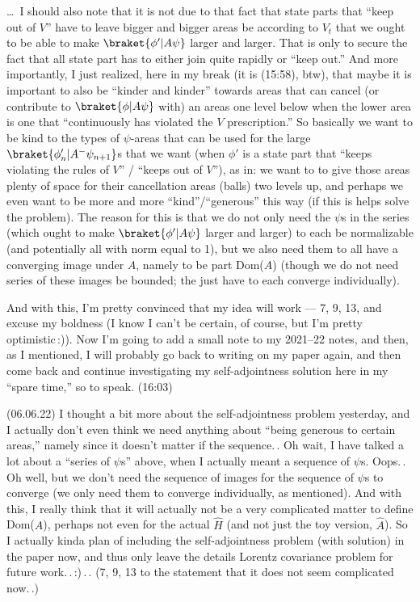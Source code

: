 \documentclass{report}
\begin{document}
\ldots\ I should also note that it is not due to that fact that state parts that ``keep out of $V$'' have to leave bigger and bigger areas be according to $V_t$ that we ought to be able to make $\braket{\phi' | A \psi}$ larger and larger. That is only to secure the fact that all state part has to either join quite rapidly or ``keep out.'' And more importantly, I just realized, here in my break (it is (15:58), btw), that maybe it is important to also be ``kinder and kinder'' towards areas that can cancel (or contribute to $\braket{\phi | A \psi}$ with) an areas one level below when the lower area is one that ``continuously has violated the $V$ prescription.'' So basically we want to be kind to the types of $\psi$-areas that can be used for the large $\braket{\phi_{n}' | A^- \psi_{n+1}}$s that we want (when $\phi'$ is a state part that ``keeps violating the rules of $V$'' / ``keeps out of $V$''), as in: we want to to give those areas plenty of space for their cancellation areas (balls) two levels up, and perhaps we even want to be more and more ``kind''/``generous'' this way (if this is helps solve the problem). The reason for this is that we do not only need the $\psi$s in the series (which ought to make $\braket{\phi' | A \psi}$ larger and larger) to each be normalizable (and potentially all with norm equal to 1), but we also need them to all have a converging image under $A$, namely to be part Dom($A$) (though we do not need series of these images be bounded; the just have to each converge individually). %

And with this, I'm pretty convinced that my idea will work --- 7, 9, 13, and excuse my boldness (I know I can't be certain, of course, but I'm pretty optimistic\,:)). Now I'm going to add a small note to my 2021--22 notes, and then, as I mentioned, I will probably go back to writing on my paper again, and then come back and continue investigating my self-adjointness solution here in my ``spare time,'' so to speak. (16:03)


(06.06.22) I thought a bit more about the self-adjointness problem yesterday, and I actually don't even think we need anything about ``being generous to certain areas,'' namely since it doesn't matter if the sequence.\,. Oh wait, I have talked a lot about a ``series of $\psi$s'' above, when I actually meant a sequence of $\psi$s. Oops.\,. Oh well, but we don't need the sequence of images for the sequence of $\psi$s to converge (we only need them to converge individually, as mentioned). And with this, I really think that it will actually not be a very complicated matter to define Dom($A$), perhaps not even for the actual $\hat H$ (and not just the toy version, $\hat A$). So I actually kinda plan of including the self-adjointness problem (with solution) in the paper now, and thus only leave the details Lorentz covariance problem for future work.\,.\,:)\,.\,. (7, 9, 13 to the statement that it does not seem complicated now.\,.)
\end{document}
